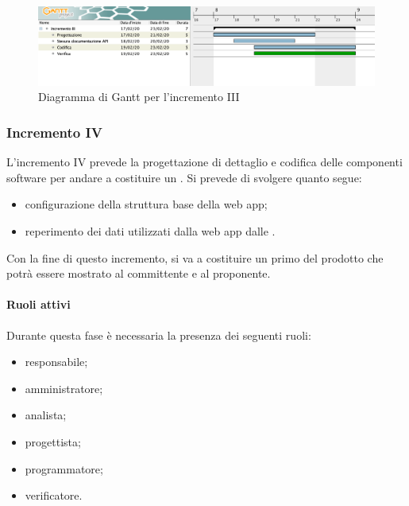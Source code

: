 		\begin{landscape}
          \begin{figure}[H]
            \centering
            \includegraphics[width=\linewidth]{images/gantt/incrementoIII} %
            \caption{Diagramma di Gantt per l'incremento III}
          \end{figure}		
		\end{landscape}


		\subsubsection{Incremento IV}
			
			L'incremento IV prevede la progettazione di dettaglio e codifica delle componenti software per andare a costituire un . Si prevede di svolgere quanto segue:
			\begin{itemize}
				\item configurazione della struttura base della web app;
				\item reperimento dei dati utilizzati dalla web app dalle .
			\end{itemize}
			Con la fine di questo incremento, si va a costituire un primo  del prodotto che potrà essere mostrato al committente e al proponente.
			
			\paragraph{Ruoli attivi}
			
				Durante questa fase è necessaria la presenza dei seguenti ruoli:
				\begin{itemize}
					\item responsabile;
					\item amministratore;
					\item analista;
					\item progettista;
					\item programmatore;
					\item verificatore.
				\end{itemize}
			
